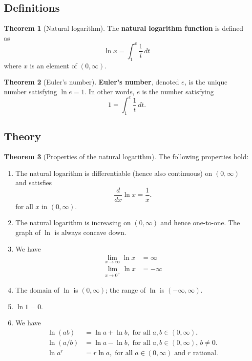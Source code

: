 \documentclass[11pt]{article}
\theoremstyle{definition}
\theoremstyle{named}
\newtheorem*{namedtheorem}{Theorem}
\numberwithin{myalgctr}{section}
\begin{document}
\thispagestyle{fancy}
\subsection*{Definitions}
\begin{namedtheorem}[Natural logarithm] The {\bf natural logarithm function}  is defined as
  \[
  \ln x=\int_1^x\frac{1}{t}\, dt
  \]
  where $x$ is an element of $(0,\infty)$.

\end{namedtheorem}
\begin{namedtheorem}[Euler's number] {\bf Euler's number}, denoted $e$, is the unique number satisfying $\ln e=1$. In other words, $e$ is the number satisfying
  \[
  1=\int_1^e\frac{1}{t}\, dt.
  \]

\end{namedtheorem}
\subsection*{Theory}
\begin{namedtheorem}[Properties of the natural logarithm]
  The following properties hold:
  \begin{enumerate}
    \item The natural logarithm is differentiable (hence also continuous) on $(0,\infty)$ and satisfies
    \[
    \frac{d}{dx}\ln x=\frac{1}{x}.
    \]
    for all $x$ in $(0,\infty)$.
    \item The natural logarithm is increasing on $(0,\infty)$ and hence one-to-one. The graph of $\ln$ is always concave down.
    \item We have
    \begin{align*}
      \lim_{x\to\infty}\ln x&=\infty\\
      \lim_{x\to 0^+}\ln x&=-\infty
    \end{align*}
    \item The domain of $\ln$ is $(0,\infty)$; the range of $\ln$ is $(-\infty, \infty)$.
    \item $\ln 1=0$.
    \item We have
    \begin{align*}
      \ln(ab)&=\ln a+\ln b,  \text{ for all $a,b\in (0,\infty)$.}\\
      \ln(a/b)&=\ln a-\ln b,  \text{ for all $a,b\in (0,\infty)$, $b\ne 0$.}\\
      \ln a^r&=r\ln a,  \text{ for all $a\in (0,\infty)$ and $r$ rational.}
    \end{align*}
  \end{enumerate}
\end{namedtheorem}
\end{document}
